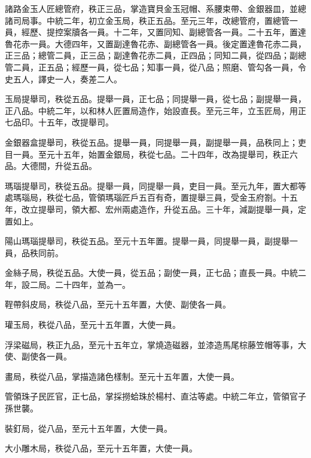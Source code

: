 \begin{pinyinscope}
 諸路金玉人匠總管府，秩正三品，掌造寶貝金玉冠帽、系腰束帶、金銀器皿，並總諸司局事。中統二年，初立金玉局，秩正五品。至元三年，改總管府，置總管一員，經歷、提控案牘各一員。十二年，又置同知、副總管各一員。二十五年，置達魯花赤一員。大德四年，又置副達魯花赤、副總管各一員。後定置達魯花赤二員，正三品；總管二員，正三品；副達魯花赤二員，正四品；同知二員，從四品；副總管二員，正五品；經歷一員，從七品；知事一員，從八品；照磨、管勾各一員，令史五人，譯史一人，奏差二人。



 玉局提舉司，秩從五品。提舉一員，正七品；同提舉一員，從七品；副提舉一員，正八品。中統二年，以和林人匠置局造作，始設直長。至元三年，立玉匠局，用正七品印。十五年，改提舉司。



 金銀器盒提舉司，秩從五品。提舉一員，同提舉一員，副提舉一員，品秩同上；吏目一員。至元十五年，始置金銀局，秩從七品。二十四年，改為提舉司，秩正六品。大德間，升從五品。



 瑪瑙提舉司，秩從五品。提舉一員，同提舉一員，吏目一員。至元九年，置大都等處瑪瑙局，秩從七品，管領瑪瑙匠戶五百有奇，置提舉三員，受金玉府劄。十五年，改立提舉司，領大都、宏州兩處造作，升從五品。三十年，減副提舉一員，定置如上。



 陽山瑪瑙提舉司，秩從五品。至元十五年置。提舉一員，同提舉一員，副提舉一員，品秩同前。



 金絲子局，秩從五品。大使一員，從五品；副使一員，正七品；直長一員。中統二年，設二局。二十四年，並為一。



 鞓帶斜皮局，秩從八品，至元十五年置，大使、副使各一員。



 瓘玉局，秩從八品，至元十五年置，大使一員。



 浮梁磁局，秩正九品，至元十五年立，掌燒造磁器，並漆造馬尾棕藤笠帽等事，大使、副使各一員。



 畫局，秩從八品，掌描造諸色樣制。至元十五年置，大使一員。



 管領珠子民匠官，正七品，掌採撈蛤珠於楊村、直沽等處。中統二年立，管領官子孫世襲。



 裝釘局，從八品，至元十五年置，大使一員。



 大小雕木局，秩從八品，至元十五年置，大使一員。




\end{pinyinscope}
